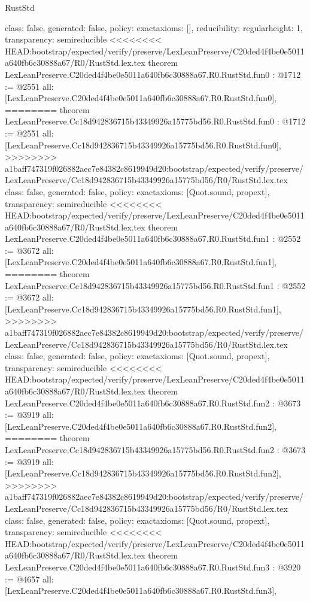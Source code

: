 \begin{lexlean}{RustStd}
\begin{coremodule}
{\begin{coremodule}
{{{  class: false,
  generated: false,
  policy: exact{axioms: []},
  reducibility: regular{height: 1},
  transparency: semireducible
}
<<<<<<<< HEAD:bootstrap/expected/verify/preserve/LexLeanPreserve/C20ded4f4be0e5011a640fb6c30888a67/R0/RustStd.lex.tex
theorem LexLeanPreserve.C20ded4f4be0e5011a640fb6c30888a67.R0.RustStd.fun0 : @1712 := @2551 {
  all: [LexLeanPreserve.C20ded4f4be0e5011a640fb6c30888a67.R0.RustStd.fun0],
========
theorem LexLeanPreserve.Cc18d942836715b43349926a15775bd56.R0.RustStd.fun0 : @1712 := @2551 {
  all: [LexLeanPreserve.Cc18d942836715b43349926a15775bd56.R0.RustStd.fun0],
>>>>>>>> a1baff747319f026882aec7e84382c8619949d20:bootstrap/expected/verify/preserve/LexLeanPreserve/Cc18d942836715b43349926a15775bd56/R0/RustStd.lex.tex
  class: false,
  generated: false,
  policy: exact{axioms: [Quot.sound, propext]},
  transparency: semireducible
}
<<<<<<<< HEAD:bootstrap/expected/verify/preserve/LexLeanPreserve/C20ded4f4be0e5011a640fb6c30888a67/R0/RustStd.lex.tex
theorem LexLeanPreserve.C20ded4f4be0e5011a640fb6c30888a67.R0.RustStd.fun1 : @2552 := @3672 {
  all: [LexLeanPreserve.C20ded4f4be0e5011a640fb6c30888a67.R0.RustStd.fun1],
========
theorem LexLeanPreserve.Cc18d942836715b43349926a15775bd56.R0.RustStd.fun1 : @2552 := @3672 {
  all: [LexLeanPreserve.Cc18d942836715b43349926a15775bd56.R0.RustStd.fun1],
>>>>>>>> a1baff747319f026882aec7e84382c8619949d20:bootstrap/expected/verify/preserve/LexLeanPreserve/Cc18d942836715b43349926a15775bd56/R0/RustStd.lex.tex
  class: false,
  generated: false,
  policy: exact{axioms: [Quot.sound, propext]},
  transparency: semireducible
}
<<<<<<<< HEAD:bootstrap/expected/verify/preserve/LexLeanPreserve/C20ded4f4be0e5011a640fb6c30888a67/R0/RustStd.lex.tex
theorem LexLeanPreserve.C20ded4f4be0e5011a640fb6c30888a67.R0.RustStd.fun2 : @3673 := @3919 {
  all: [LexLeanPreserve.C20ded4f4be0e5011a640fb6c30888a67.R0.RustStd.fun2],
========
theorem LexLeanPreserve.Cc18d942836715b43349926a15775bd56.R0.RustStd.fun2 : @3673 := @3919 {
  all: [LexLeanPreserve.Cc18d942836715b43349926a15775bd56.R0.RustStd.fun2],
>>>>>>>> a1baff747319f026882aec7e84382c8619949d20:bootstrap/expected/verify/preserve/LexLeanPreserve/Cc18d942836715b43349926a15775bd56/R0/RustStd.lex.tex
  class: false,
  generated: false,
  policy: exact{axioms: [Quot.sound, propext]},
  transparency: semireducible
}
<<<<<<<< HEAD:bootstrap/expected/verify/preserve/LexLeanPreserve/C20ded4f4be0e5011a640fb6c30888a67/R0/RustStd.lex.tex
theorem LexLeanPreserve.C20ded4f4be0e5011a640fb6c30888a67.R0.RustStd.fun3 : @3920 := @4657 {
  all: [LexLeanPreserve.C20ded4f4be0e5011a640fb6c30888a67.R0.RustStd.fun3],
}}}}}}
\end{coremodule}}
\end{coremodule}
\end{lexlean}
